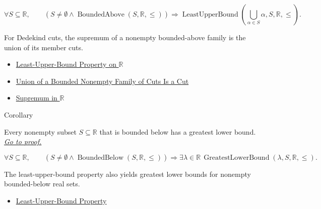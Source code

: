 \begin{remark*}
\[
\forall S\subseteq\mathbb{R},\qquad
\left(S\ne\emptyset\land \operatorname{BoundedAbove}(S,\mathbb{R},\le)\right)
\Longrightarrow
\operatorname{LeastUpperBound}\!\left(\bigcup_{\alpha\in S}\alpha,S,\mathbb{R},\le\right).
\]
\end{remark*}

\begin{remark*}[Interpretation]
For Dedekind cuts, the supremum of a nonempty bounded-above family is the union of its member cuts.
\end{remark*}

\begin{dependencies}
\begin{itemize}
  \item \hyperref[def:least-upper-bound-property-on-r]{Least-Upper-Bound Property on $\mathbb{R}$}
  \item \hyperref[lem:union-of-cuts-is-a-cut]{Union of a Bounded Nonempty Family of Cuts Is a Cut}
  \item \hyperref[def:supremum-in-r]{Supremum in $\mathbb{R}$}
\end{itemize}
\end{dependencies}

\begin{corollarybox}{Corollary}
\begin{corollary}
\label{cor:glb-property-r}
Every nonempty subset $S\subseteq\mathbb{R}$ that is bounded below has a
greatest lower bound.
\hyperref[prf:glb-property-r]{\textit{Go to proof.}}
\end{corollary}
\end{corollarybox}

\begin{remark*}
\[
\forall S\subseteq\mathbb{R},\qquad
\left(S\ne\emptyset\land \operatorname{BoundedBelow}(S,\mathbb{R},\le)\right)
\Longrightarrow
\exists\lambda\in\mathbb{R}\,\operatorname{GreatestLowerBound}(\lambda,S,\mathbb{R},\le).
\]
\end{remark*}

\begin{remark*}[Interpretation]
The least-upper-bound property also yields greatest lower bounds for nonempty bounded-below real sets.
\end{remark*}

\begin{dependencies}
\begin{itemize}
  \item \hyperref[thm:lub-property-r]{Least-Upper-Bound Property}
\end{itemize}
\end{dependencies}
